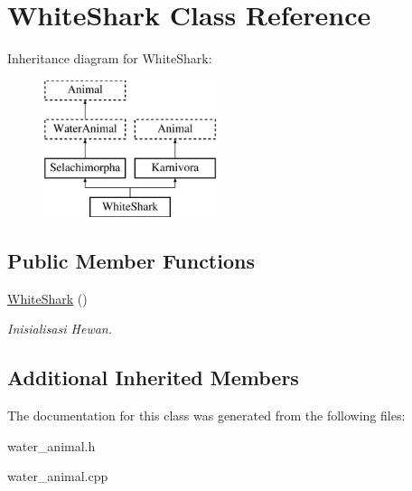 \hypertarget{class_white_shark}{}\section{White\+Shark Class Reference}
\label{class_white_shark}
Inheritance diagram for White\+Shark\+:\begin{figure}[H]
\begin{center}
\leavevmode
\includegraphics[height=4.000000cm]{class_white_shark}
\end{center}
\end{figure}
\subsection*{Public Member Functions}
\begin{DoxyCompactItemize}
\item 
\hyperlink{class_white_shark_abd3e920a0808c805c07350003157057c}{White\+Shark} ()\hypertarget{class_white_shark_abd3e920a0808c805c07350003157057c}{}\label{class_white_shark_abd3e920a0808c805c07350003157057c}

\begin{DoxyCompactList}\small\item\em Inisialisasi Hewan. \end{DoxyCompactList}\end{DoxyCompactItemize}
\subsection*{Additional Inherited Members}


The documentation for this class was generated from the following files\+:\begin{DoxyCompactItemize}
\item 
water\+\_\+animal.\+h\item 
water\+\_\+animal.\+cpp\end{DoxyCompactItemize}
